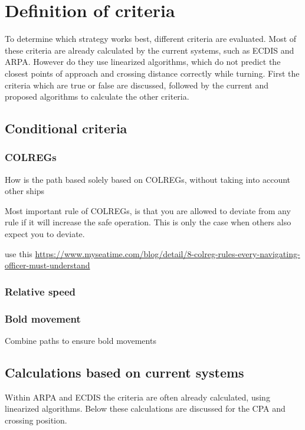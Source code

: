 \chapter{Definition of criteria}
\label{ch:criteria}
To determine which strategy works best, different criteria are evaluated. Most of these criteria are already calculated by the current systems, such as \ac{ECDIS} and \ac{ARPA}. However do they use linearized algorithms, which do not predict the closest points of approach and crossing distance correctly while turning. First the criteria which are true or false are discussed, followed by the current and proposed algorithms to calculate the other criteria.

\section{Conditional criteria}

\subsection{COLREGs}
How is the path based solely based on COLREGs, without taking into account other ships

Most important rule of \ac{COLREGs}, is that you are allowed to deviate from any rule if it will increase the safe operation. This is only the case when others also expect you to deviate.

use this \url{https://www.myseatime.com/blog/detail/8-colreg-rules-every-navigating-officer-must-understand}

\subsection{Relative speed}

\subsection{Bold movement}
Combine paths to ensure bold movements


\section{Calculations based on current systems}
Within \ac{ARPA} and \ac{ECDIS} the criteria are often already calculated, using linearized algorithms. Below these calculations are discussed for the \ac{CPA} and crossing position.

